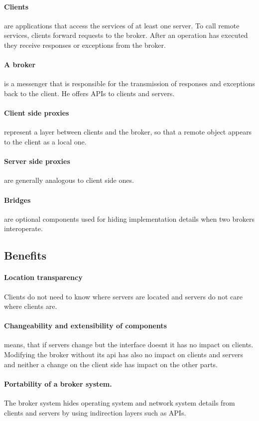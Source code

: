 \documentclass[a4paper,11pt,twocolumn]{report}
\begin{document}
    \paragraph{Clients} are applications that access the services of at least
    one server. To call remote services, clients forward requests to the
    broker. After an operation has executed they receive responses or
    exceptions from the broker.
    \paragraph{A broker} is a messenger that is responsible for the
    transmission of responses and exceptions back to the client. He offers APIs
    to clients and servers.
    \paragraph{Client side proxies} represent a layer between clients and the
    broker, so that a remote object appears to the client as a local one.
    \paragraph{Server side proxies} are generally analogous to client side ones.
    \paragraph{Bridges} are optional components used for hiding implementation
    details when two brokers interoperate. 
    \subsection{Benefits}
    \paragraph{Location transparency} Clients do not need to know where servers
    are located and servers do not care where clients are.
    \paragraph{Changeability and extensibility of components} means, that if
    servers change but the interface doesnt it has no impact on clients.
    Modifying the broker without its api has also no impact on clients and
    servers and neither a change on the client side has impact on the other
    parts.
    \paragraph{Portability of a broker system.} The broker system hides
    operating system and network system details from clients and servers by
    using indirection layers such as APIs.
\end{document}
